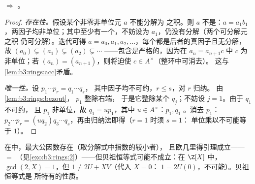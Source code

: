 \begin{theorem}\label{thm:b3:rings:pidufd}
 $\Rightarrow$ 。
\end{theorem}

\begin{proof}
\emph{存在性。}假设某个非零非单位元 $a$ 不能分解为
之积。则 $a$ 不是：$a =
a_1b_1$，两因子均非单位；其中至少有一个，不妨设为
$a_1$，仍没有分解（两个可分解元之积
仍可分解）。迭代可得 $a = a_0, a_1, a_2,
\dots$，每个都是后者的真因子且无分解，
故 $(a_0) \subsetneq (a_1) \subsetneq (a_2) \subsetneq \cdots$
——包含是严格的，因为在 $a_n = a_{n+1}c$ 中 $c$ 为
非单位；若 $(a_n) = (a_{n+1})$，则将迫使 $c \in A^\times$（整环中可消去）。
这与\cref{lem:b3:rings:acc}矛盾。

\emph{唯一性。}设 $p_1 \cdots p_r = q_1 \cdots q_s$，
其中因子均不可约，$r \leq s$，对 $r$ 归纳。
由\cref{lem:b3:rings:bezout}， $p_1$ 整除右端，
于是它整除某个 $q_j$；不妨设 $j = 1$。由于 $q_1$ 不可约，
且 $p_1$ 非单位，故 $q_1 = u p_1$，其中 $u \in A^\times$：$p_1,
q_1$ 。消去 $p_1$：$p_2 \cdots p_r = (u q_2)
q_3\cdots q_s$，再由归纳法即得（$r = 1$ 时须 $s = 1$：
单位乘以不可能等于 $1$）。
\end{proof}

\begin{remark}\label{rem:b3:rings:ufdgcd}
在中，最大公因数存在（取分解式中指数的较小者），
且欧几里得引理成立—— $=$ 
（见\cref{exo:b3:rings:2}）——但贝祖恒等式可能不成立：在 $\Z[X]$ 中，
$\gcd(2, X) = 1$，但 $1 \neq 2U + XV$（代入 $X = 0$：
$1 = 2U(0)$，不可能）。贝祖恒等式是
所特有的性质。
\end{remark}

